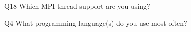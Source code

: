 \begin{description}%
\item{Q18} Which MPI thread support are you using?%
\item{Q4} What programming language(s) do you use most often?%
\end{description}%

